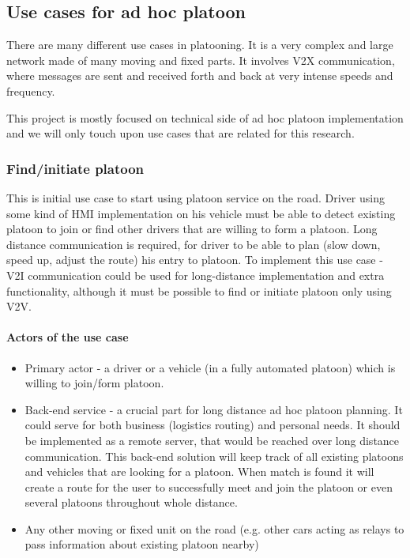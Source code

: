 \subsection{Use cases for ad hoc platoon}
% 
There are many different use cases in platooning. It is a very complex and large network made of many moving and fixed parts. It involves \acrshort{V2X} communication, where messages are sent and received forth and back at very intense speeds and frequency.\par
%  
This project is mostly focused on technical side of ad hoc platoon implementation and we will only touch upon use cases that are related for this research.
% 
\subsubsection{Find/initiate platoon}
% 
This is initial use case to start using platoon service on the road. Driver using some kind of \acrshort{HMI} implementation on his vehicle must be able to detect existing platoon to join or find other drivers that are willing to form a platoon. Long distance communication is required, for driver to be able to plan (slow down, speed up, adjust the route) his entry to platoon. To implement this use case - \acrshort{V2I} communication could be used for long-distance implementation and extra functionality, although it must be possible to find or initiate platoon only using \acrshort{V2V}. 
% 
\paragraph{Actors of the use case}
\begin{itemize}[noitemsep]
    \item Primary actor - a driver or a vehicle (in a fully automated platoon) which is willing to join/form platoon.
    \item Back-end service - a crucial part for long distance ad hoc platoon planning. It could serve for both business (logistics routing) and personal needs. It should be implemented as a remote server, that would be reached over long distance communication. This back-end solution will keep track of all existing platoons and vehicles that are looking for a platoon. When match is found it will create a route for the user to successfully meet and join the platoon or even several platoons throughout whole distance.
    \item Any other moving or fixed unit on the road (e.g. other cars acting as relays to pass information about existing platoon nearby)
\end{itemize}
% 
